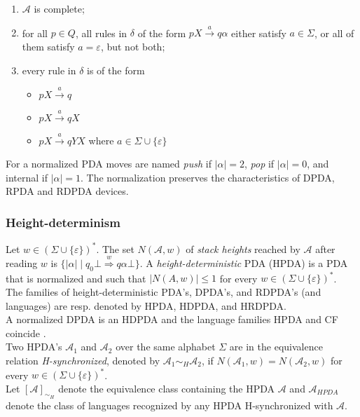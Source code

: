 \documentclass[3p,11pt]{elsarticle}
\begin{document}
\begin{enumerate}
    \item $\mathcal{A}$ is complete;
    \item for all $p\in Q$, all rules in $\delta$ of the form $pX \stackrel a \to q \alpha$
    either satisfy $a\in \Sigma$, or all of them satisfy $a=\varepsilon$, but not both;
    \item every rule in $\delta$ is of the form
    \begin{itemize}
        \item $pX \stackrel a \to q $
        \item $pX \stackrel a \to q X $
        \item $pX \stackrel a \to q Y X $ where $a \in \Sigma \cup \{\varepsilon\} $
    \end{itemize}
\end{enumerate}
For a normalized PDA moves are named \emph{push} if $|\alpha| = 2$, \emph{pop} if $|\alpha| = 0$, and internal if $|\alpha|=1$. The normalization preserves the characteristics of DPDA, RPDA and RDPDA devices.
 \subsubsection*{Height-determinism}
 Let $w\in (\Sigma \cup \{\varepsilon\})^\ast$. The set $N(\mathcal{A},w)$ of \emph{stack heights} reached by $\mathcal{A}$ after reading $w$ is $\{|\alpha| \mid q_0\bot \stackrel w \Longrightarrow q\alpha\bot\}$. A \emph{height-deterministic} PDA (HPDA) is a PDA that is normalized and such that $|N(A,w)|\leq 1$ for every $w \in (\Sigma \cup \{\varepsilon\})^\ast$.
\\The families of height-deterministic PDA's, DPDA's, and RDPDA's  (and languages) are resp. denoted by HPDA, HDPDA, and HRDPDA.
\\
A normalized DPDA is an HDPDA and the language families HPDA and CF coincide \cite{conf/mfcs/NowotkaS07}.
\\
Two HPDA's $\mathcal{A}_1$ and $\mathcal{A}_2$ over the same alphabet $\Sigma$ are in the equivalence relation \emph{H-synchronized}, denoted by $\mathcal{A}_1\sim_H \mathcal{A}_2$, if $N(\mathcal{A}_1,w)=N(\mathcal{A}_2,w)$ for every $w \in (\Sigma \cup \{\varepsilon\})^\ast$.
\\
Let $[\mathcal{A}]_{\sim_H}$ denote the equivalence class containing the HPDA $\mathcal{A}$ and $\mathcal{A}_{HPDA}$ denote the class of languages recognized by any HPDA H-synchronized with $\mathcal{A}$.
\end{document}

